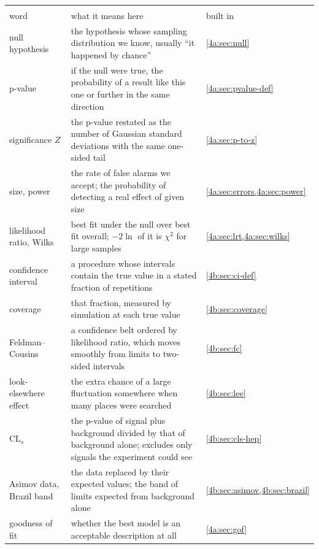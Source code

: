 \begin{center}
\small
\renewcommand{\arraystretch}{1.18}
\begin{tabularx}{\linewidth}{@{}>{\raggedright\arraybackslash}p{3.0cm}
                               >{\raggedright\arraybackslash}X
                               >{\raggedright\arraybackslash}p{2.0cm}@{}}
\toprule
\multicolumn{3}{@{}l}{\textbf{Tests and intervals}}\\
word & what it means here & built in\\\midrule
null hypothesis & the hypothesis whose sampling distribution we know, usually ``it happened by chance'' & \cref{4a:sec:null}\\
p-value & if the null were true, the probability of a result like this one or further in the same direction & \cref{4a:sec:pvalue-def}\\
significance $Z$ & the p-value restated as the number of Gaussian standard deviations with the same one-sided tail & \cref{4a:sec:p-to-z}\\
size, power & the rate of false alarms we accept; the probability of detecting a real effect of given size & \cref{4a:sec:errors,4a:sec:power}\\
likelihood ratio, Wilks & best fit under the null over best fit overall; $-2\ln$ of it is $\chi^2$ for large samples & \cref{4a:sec:lrt,4a:sec:wilks}\\
confidence interval & a procedure whose intervals contain the true value in a stated fraction of repetitions & \cref{4b:sec:ci-def}\\
coverage & that fraction, measured by simulation at each true value & \cref{4b:sec:coverage}\\
Feldman--Cousins & a confidence belt ordered by likelihood ratio, which moves smoothly from limits to two-sided intervals & \cref{4b:sec:fc}\\
look-elsewhere effect & the extra chance of a large fluctuation somewhere when many places were searched & \cref{4b:sec:lee}\\
$\mathrm{CL}_s$ & the p-value of signal plus background divided by that of background alone; excludes only signals the experiment could see & \cref{4b:sec:cls-hep}\\
Asimov data, Brazil band & the data replaced by their expected values; the band of limits expected from background alone & \cref{4b:sec:asimov,4b:sec:brazil}\\
goodness of fit & whether the best model is an acceptable description at all & \cref{4a:sec:gof}\\
\bottomrule
\end{tabularx}
\end{center}


